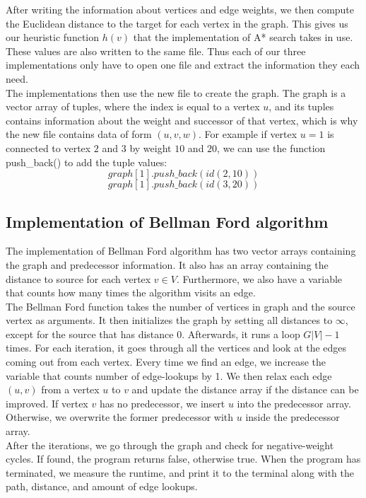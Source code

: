 \documentclass[11pt]{article}
\begin{document}
\noindent After writing the information about vertices and edge weights, we then compute the Euclidean distance to the target for each vertex in the graph. This gives us our heuristic function $h(v)$ that the implementation of A* search takes in use. These values are also written to the same file. Thus each of our three implementations only have to open one file and extract the information they each need.\\

\noindent The implementations then use the new file to create the graph. The graph is a vector array of tuples, where the index is equal to a vertex $u$, and its tuples contains information about the weight and successor of that vertex, which is why the new file contains data of form $(u,v,w)$. For example if vertex $u=1$ is connected to vertex $2$ and $3$ by weight $10$ and $20$, we can use the function push{\_}back() to add the tuple values:
$$graph[1].push{\_}back(id(2, 10))$$
$$graph[1].push{\_}back(id(3, 20))$$ 

\subsection{Implementation of Bellman Ford algorithm}
The implementation of Bellman Ford algorithm has two vector arrays containing the graph and predecessor information. It also has an array containing the distance to source for each vertex $v\in V$. Furthermore, we also have a variable that counts how many times the algorithm visits an edge.\\

\noindent The Bellman Ford function takes the number of vertices in graph and the source vertex as arguments. It then initializes the graph by setting all distances to $\infty$, except for the source that has distance $0$. Afterwards, it runs a loop $G|V| - 1$ times. For each iteration, it goes through all the vertices and look at the edges coming out from each vertex. Every time we find an edge, we increase the variable that counts number of edge-lookups by 1. We then relax each edge $(u,v)$ from a vertex $u$ to $v$ and update the distance array if the distance can be improved. If vertex $v$ has no predecessor, we insert $u$ into the predecessor array. Otherwise, we overwrite the former predecessor with $u$ inside the predecessor array.\\

\noindent After the iterations, we go through the graph and check for negative-weight cycles. If found, the program returns false, otherwise true. When the program has terminated, we measure the runtime, and print it to the terminal along with the path, distance, and amount of edge lookups.
\end{document}
